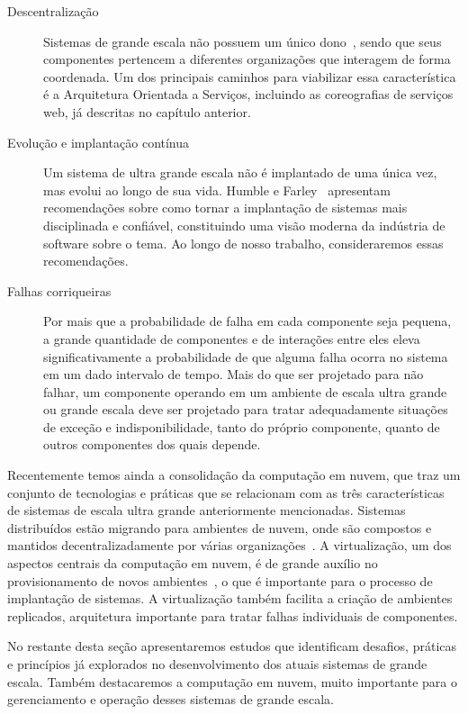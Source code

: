 \begin{description}

\item [Descentralização] Sistemas de grande escala não possuem um único dono~\cite{Steen2011VeryLarge}, sendo que seus componentes pertencem a diferentes organizações que interagem de forma coordenada. Um dos principais caminhos para viabilizar essa característica é a Arquitetura Orientada a Serviços, incluindo as coreografias de serviços web, já descritas no capítulo anterior.

\item [Evolução e implantação contínua] Um sistema de ultra grande escala não é implantado de uma única vez, mas evolui ao longo de sua vida. Humble e Farley~\cite{Humble2011Continuous} apresentam recomendações sobre como tornar a implantação de sistemas mais disciplinada e confiável, constituindo uma visão moderna da indústria de software sobre o tema. Ao longo de nosso trabalho, consideraremos essas recomendações. 

\item [Falhas corriqueiras] Por mais que a probabilidade de falha em cada componente seja pequena, a grande quantidade de componentes e de interações entre eles eleva significativamente a probabilidade de que alguma falha ocorra no sistema em um dado intervalo de tempo. Mais do que ser projetado para não falhar, um componente operando em um ambiente de escala ultra grande ou grande escala deve ser projetado para tratar adequadamente situações de exceção e indisponibilidade, tanto do próprio componente, quanto de outros componentes dos quais depende. 

\end{description}

Recentemente temos ainda a consolidação da computação em nuvem, que traz um conjunto de tecnologias e práticas que se relacionam com as três características de sistemas de escala ultra grande anteriormente mencionadas. Sistemas distribuídos estão migrando para ambientes de nuvem, onde são compostos e mantidos decentralizadamente por várias organizações~\cite{Steen2011VeryLarge}. A virtualização, um dos aspectos centrais da computação em nuvem, é de grande auxílio no provisionamento de novos ambientes~\cite{Humble2011Continuous}, o que é importante para o processo de implantação de sistemas. A virtualização também facilita a criação de ambientes replicados, arquitetura importante para tratar falhas individuais de componentes.

No restante desta seção apresentaremos estudos que identificam desafios, práticas e princípios já explorados no desenvolvimento dos atuais sistemas de grande escala. Também destacaremos a computação em nuvem, muito importante para o gerenciamento e operação desses sistemas de grande escala.

